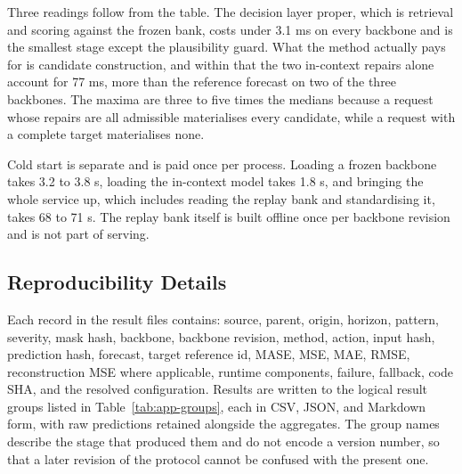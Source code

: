 \documentclass{article}
\begin{document}
Three readings follow from the table. The decision layer proper, which is retrieval and
scoring against the frozen bank, costs under 3.1 ms on every backbone and is the smallest
stage except the plausibility guard. What the method actually pays for is candidate
construction, and within that the two in-context repairs alone account for 77 ms, more than
the reference forecast on two of the three backbones. The maxima are three to five times the
medians because a request whose repairs are all admissible materialises every candidate, while
a request with a complete target materialises none.

Cold start is separate and is paid once per process. Loading a frozen backbone takes 3.2 to
3.8 s, loading the in-context model takes 1.8 s, and bringing the whole service up, which
includes reading the replay bank and standardising it, takes 68 to 71 s. The replay bank
itself is built offline once per backbone revision and is not part of serving.

\subsection{Reproducibility Details}
\label{app:reprodetails}
Each record in the result files contains: source, parent, origin, horizon, pattern,
severity, mask hash, backbone, backbone revision, method, action, input hash, prediction
hash, forecast, target reference id, MASE, MSE, MAE, RMSE, reconstruction MSE where
applicable, runtime components, failure, fallback, code SHA, and the resolved configuration.
Results are written to the logical result groups listed in Table~\ref{tab:app-groups}, each in
CSV, JSON, and Markdown form, with raw predictions retained alongside the aggregates. The
group names describe the stage that produced them and do not encode a version number, so that
a later revision of the protocol cannot be confused with the present one.
\end{document}

